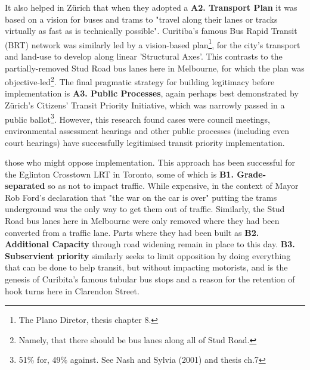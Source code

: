 \documentclass{tufte-handout}
\begin{document}
It also helped in Zürich that when they adopted a \textbf{A2. Transport Plan} it was based on a vision for buses and trams to "travel along their lanes or tracks virtually as fast as is technically possible"\cite{Nash:2001ab}. Curitiba's famous Bus Rapid Transit (BRT) network was similarly led by a vision-based plan\footnote{The Plano Diretor, thesis chapter 8.}, for the city's transport and land-use to develop along linear 'Structural Axes'. This contrasts to the partially-removed Stud Road bus lanes here in Melbourne, for which the plan was objective-led\footnote{Namely, that there should be bus lanes along all of Stud Road.}.
The final pragmatic strategy for building legitimacy before implementation is \textbf{A3. Public Processes}, again perhaps best demonstrated by Zürich's Citizens' Transit Priority Initiative, which was narrowly passed in a public ballot\footnote{51\% for, 49\% against.  See Nash and Sylvia (2001) and thesis ch.7}. However, this research found cases were council meetings, environmental assessment hearings and other public processes (including even court hearings) have successfully legitimised transit priority implementation.  

 those who might oppose  implementation.  This approach has been successful for the Eglinton Crosstown LRT in Toronto, some of which is \textbf{B1. Grade-separated} so as not to impact traffic. While expensive, in the context of Mayor Rob Ford's declaration that "the war on the car is over" putting the trams underground was the only way to get them out of traffic. Similarly,  the Stud Road bus lanes here in Melbourne were only removed where they had been converted from a traffic lane. Parts where they had been built as \textbf{B2. Additional Capacity} through road widening remain in place to this day.  \textbf{B3. Subservient priority} similarly seeks to limit opposition  by doing everything that can be done to help transit, but without impacting motorists, and is the genesis of Curibita's famous tubular bus stops and a reason for the retention of hook turns here in Clarendon Street. 
\end{document}
